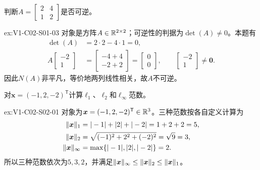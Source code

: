 \begin{SLChapterExercisePairSection}
\begin{exercise}[行列式与可逆性]\label{ex:V1-C02-S01-03}
判断$A=\begin{bmatrix}2&4\\1&2\end{bmatrix}$是否可逆。
\end{exercise}
\label{sol:V1-C02-S01-03}
\begin{chapterexercisesolution}{ex:V1-C02-S01-03}
对象是方阵$A\in\mathbb{R}^{2\times2}$；可逆性的判据为$\det(A)\ne0$。本题有
\[
\begin{aligned}
\det(A)&=2\cdot2-4\cdot1=0,\\
A\begin{bmatrix}-2\\1\end{bmatrix}
&=\begin{bmatrix}-4+4\\-2+2\end{bmatrix}
=\begin{bmatrix}0\\0\end{bmatrix},
\qquad \begin{bmatrix}-2\\1\end{bmatrix}\ne\boldsymbol0.
\end{aligned}
\]
因此$N(A)$非平凡，等价地两列线性相关，故$A$不可逆。
\end{chapterexercisesolution}

\begin{exercise}[三种范数]\label{ex:V1-C02-S02-01}
对$\boldsymbol{x}=(-1,2,-2)^{\mathsf T}$计算$\ell_1$、$\ell_2$和$\ell_{\infty}$范数。
\end{exercise}
\label{sol:V1-C02-S02-01}
\begin{chapterexercisesolution}{ex:V1-C02-S02-01}
对象为$\boldsymbol{x}=(-1,2,-2)^{\mathsf T}\in\mathbb{R}^3$。三种范数按各自定义计算为
\[
\begin{aligned}
\lVert\boldsymbol{x}\rVert_1
&=|-1|+|2|+|-2|=1+2+2=5,\\
\lVert\boldsymbol{x}\rVert_2
&=\sqrt{(-1)^2+2^2+(-2)^2}=\sqrt9=3,\\
\lVert\boldsymbol{x}\rVert_\infty
&=\max\{|-1|,|2|,|-2|\}=2.
\end{aligned}
\]
所以三种范数依次为$5,3,2$，并满足$\lVert\boldsymbol x\rVert_\infty\le\lVert\boldsymbol x\rVert_2\le\lVert\boldsymbol x\rVert_1$。
\end{chapterexercisesolution}


\end{SLChapterExercisePairSection}
